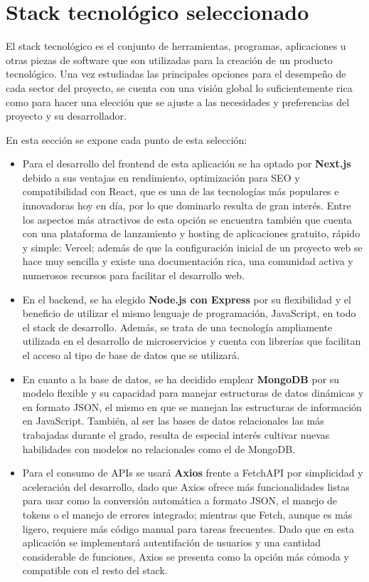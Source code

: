 \section{Stack tecnológico seleccionado}

El stack tecnológico es el conjunto de herramientas, programas, aplicaciones u otras piezas de software que son utilizadas para la creación de un producto tecnológico. Una vez estudiadas las principales opciones para el desempeño de cada sector del proyecto, se cuenta con una visión global lo suficientemente rica como para hacer una elección que se ajuste a las necesidades y preferencias del proyecto y su desarrollador.

En esta sección se expone cada punto de esta selección:

\begin{itemize}
    \item Para el desarrollo del frontend de esta aplicación se ha optado por \textbf{Next.js} debido a sus ventajas en rendimiento, optimización para SEO y compatibilidad con React, que es una de las tecnologías más populares e innovadoras hoy en día, por lo que dominarlo resulta de gran interés. Entre los aspectos más atractivos de esta opción se encuentra también que cuenta con una plataforma de lanzamiento y hosting de aplicaciones gratuito, rápido y simple: Vercel; además de que la configuración inicial de un proyecto web se hace muy sencilla y existe una documentación rica, una comunidad activa y numerosos recursos para facilitar el desarrollo web.
    \item En el backend, se ha elegido \textbf{Node.js con Express} por su flexibilidad y el beneficio de utilizar el mismo lenguaje de programación, JavaScript, en todo el stack de desarrollo. Además, se trata de una tecnología ampliamente utilizada en el desarrollo de microservicios y cuenta con librerías que facilitan el acceso al tipo de base de datos que se utilizará.
    \item En cuanto a la base de datos, se ha decidido emplear \textbf{MongoDB} por su modelo flexible y su capacidad para manejar estructuras de datos dinámicas y en formato JSON, el mismo en que se manejan las estructuras de información en JavaScript. También, al ser las bases de datos relacionales las más trabajadas durante el grado, resulta de especial interés cultivar nuevas habilidades con modelos no relacionales como el de MongoDB.
    \item Para el consumo de APIs se usará \textbf{Axios} frente a FetchAPI por simplicidad y aceleración del desarrollo, dado que Axios ofrece más funcionalidades listas para usar como la conversión automática a formato JSON, el manejo de tokens o el manejo de errores integrado; mientras que Fetch, aunque es más ligero, requiere más código manual para tareas frecuentes. Dado que en esta aplicación se implementará autentifación de usuarios y una cantidad considerable de funciones, Axios se presenta como la opción más cómoda y compatible con el resto del stack.

\end{itemize}
